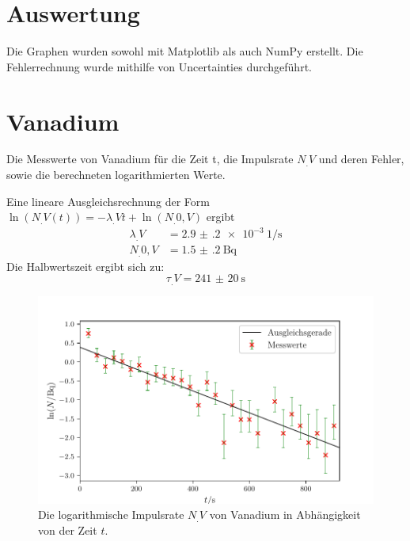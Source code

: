 \section{Auswertung}
\label{sec:Auswertung}

Die Graphen wurden sowohl mit Matplotlib \cite{matplotlib} als auch NumPy \cite{numpy} erstellt. Die
Fehlerrechnung wurde mithilfe von Uncertainties \cite{uncertainties} durchgeführt.

\section{Vanadium}

\begin{table}
	\centering
	\caption{Die Messwerte von Vanadium für die Zeit t, die Impulsrate $N_.V$ und deren Fehler, sowie die berechneten logarithmierten Werte.}
	
	\label{tab:tabVanadium}
\end{table}

Eine lineare Ausgleichsrechnung der Form $\ln(N_.V(t))=-\lambda_.V t+\ln(N_.{0,V})$ ergibt
\begin{align*}
\lambda_.V 	&= \SI{2.9(2)e-3}{1\per\second}\\
N_.{0,V} 	&= \SI{1.5(2)}{\becquerel}
\end{align*}
Die Halbwertszeit ergibt sich zu:
\begin{equation*}
\tau_.V = \SI{241(20)}{\second}
\end{equation*}

\begin{figure}
	\centering
	\includegraphics[width=\linewidth-50pt,height=\textheight-50pt,keepaspectratio]{content/images/VanadiumLog.pdf}
	\caption{Die logarithmische Impulsrate $N_.V$ von Vanadium in Abhängigkeit von der Zeit $t$.}
	\label{fig:VanadiumLog}
\end{figure}

